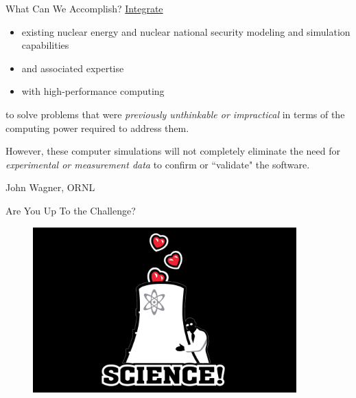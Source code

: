\documentclass[xcolor=x11names,compress, handout]{beamer}
\renewcommand{\(}{\begin{columns}}
\renewcommand{\)}{\end{columns}}
\newcommand{\<}[1]{\begin{column}{#1}}
\renewcommand{\>}{\end{column}}
\begin{document}
\begin{frame}{What Can We Accomplish?}
\underline{Integrate}
\begin{itemize}
\item existing nuclear energy and nuclear national security modeling and simulation capabilities
\item and associated expertise
\item with high-performance computing
\end{itemize}    
to solve problems that were \emph{previously unthinkable or impractical} in terms of the computing power required to address them.

\vspace*{1em}
However, these computer simulations will not completely eliminate the need for \emph{experimental or measurement data} to confirm or ``validate" the software. 

\vspace*{1em}
\hspace*{0.25 in} John Wagner, ORNL
\end{frame}

%
%

\begin{frame}{Are You Up To the Challenge?}
\begin{figure}
\includegraphics[height=2.5in,clip]{science}
\end{figure}
\end{frame}
\end{document}
